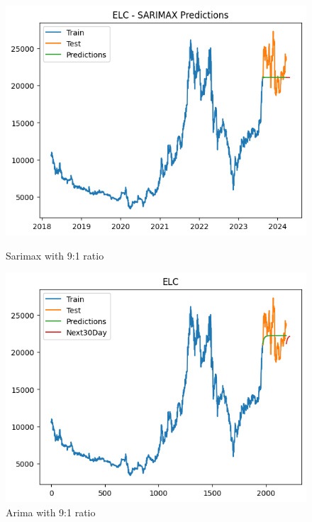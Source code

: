 \documentclass[conference]{IEEEtran}
\begin{document}
\begin{figure}[H]
    \centering
    \begin{minipage}{0.24\textwidth}
        \centering
        \includegraphics[width=\textwidth]{Figure/ELC/sarimax91.png}
        \caption{Sarimax with 9:1 ratio}
        \label{fig:image1}
    \end{minipage}
    \hfill
    \begin{minipage}{0.24\textwidth}
        \centering
        \includegraphics[width=\textwidth]{Figure/ELC/arima91.png}
        \caption{Arima with 9:1 ratio}
        \label{fig:image2}
    \end{minipage}
\end{figure}
\end{document}
